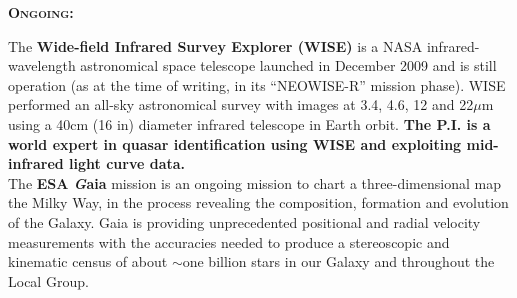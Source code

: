 
\begin{framed}
 

\noindent
\textbf{\textsc{Ongoing:}} 

The {\bf Wide-field Infrared Survey Explorer (WISE)} is a NASA
infrared-wavelength astronomical space telescope launched in December
2009 and is still operation (as at the time of writing, in its
``NEOWISE-R'' mission phase). WISE performed an all-sky astronomical
survey with images at 3.4, 4.6, 12 and 22$\mu$m using a 40cm (16 in)
diameter infrared telescope in Earth orbit.  {\bf The P.I. is a world
expert in quasar identification using WISE \citep[e.g., ][]{Ross2012,
Ross2015, Timlin2016, Timlin2018} and exploiting mid-infrared light
curve data.} \\

The \textbf{ESA {\emph Gaia}} mission is an ongoing mission to chart a
three-dimensional map the Milky Way, in the process
revealing the composition, formation and evolution of the Galaxy. 
Gaia
is providing unprecedented positional and radial velocity measurements
with the accuracies needed to produce a stereoscopic and kinematic
census of about $\sim$one billion stars in our Galaxy and throughout
the Local Group. 

\end{framed}

